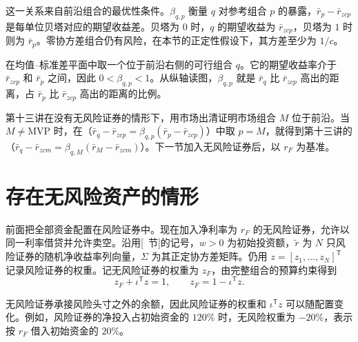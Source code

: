 这一关系来自前沿组合的最优性条件。$\beta_{q,p}$ 衡量 $q$ 对参考组合 $p$ 的暴露，$\bar r_p-\bar r_{zcp}$ 是每单位贝塔对应的期望收益差。贝塔为 $0$ 时，$q$ 的期望收益为 $\bar r_{zcp}$，贝塔为 $1$ 时则为 $\bar r_p$。零协方差组合仍有风险，在本节的正定性假设下，其方差至少为 $1/c$。

 在均值--标准差平面中取一个位于前沿右侧的可行组合 $q$。它的期望收益率介于 $\bar r_{zcp}$ 和 $\bar r_p$ 之间，因此 $0<\beta_{q,p}<1$。从纵轴读图，$\beta_{q,p}$ 就是 $\bar r_q$ 比 $\bar r_{zcp}$ 高出的距离，占 $\bar r_p$ 比 $\bar r_{zcp}$ 高出的距离的比例。

\begin{center}
\begin{minipage}{\linewidth}
\centering
\renewcommand{\thewjFigure}{\thechapter.S\arabic{wjFigure}}%
%
\par
{}
\end{minipage}
\end{center}

第十三讲在没有无风险证券的情形下，用市场出清证明市场组合 $M$ 位于前沿。当 $M\ne\mathrm{MVP}$ 时，在（$\bar r_q-\bar r_{zcp}=\beta_{q,p}(\bar r_p-\bar r_{zcp})$）中取 $p=M$，就得到第十三讲的（$\bar r_q-\bar r_{zcm}=\beta_{q,M}(\bar r_M-\bar r_{zcm})$）。下一节加入无风险证券后，以 $r_F$ 为基准。

\section{存在无风险资产的情形}\label{sec:wj-twelve-4}
前面把全部资金配置在风险证券中。现在加入净利率为 $r_F$ 的无风险证券，允许以同一利率借贷并允许卖空。沿用[~节]的记号，$w>0$ 为初始投资额，$\widetilde r$ 为 $N$ 只风险证券的随机净收益率列向量，$\Sigma$ 为其正定协方差矩阵。仍用 $z=[z_1,\ldots,z_N]^{\mathsf T}$ 记录风险证券的权重。记无风险证券的权重为 $z_F$，由完整组合的预算约束得到
\[
 z_F+\iota^{\mathsf T}z=1,
 \qquad z_F=1-\iota^{\mathsf T}z.
\]

无风险证券承接风险头寸之外的余额，因此风险证券的权重和 $\iota^{\mathsf T}z$ 可以随配置变化。例如，风险证券的净投入占初始资金的 $120\%$ 时，无风险权重为 $-20\%$，表示按 $r_F$ 借入初始资金的 $20\%$。

